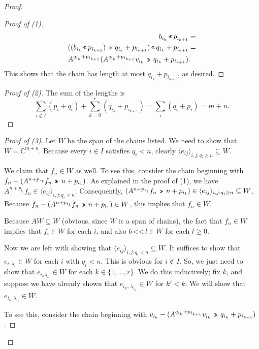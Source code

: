 \documentclass[12pt,psamsfonts]{article}
\newcommand{\leftshift}{\,\texttt{<<}\,}
\newcommand{\rightshift}{\mathbin{\rotatebox[origin=c]{180}{\leftshift}}}
\begin{document}
\begin{proof}
\begin{proof}[Proof of (1)]
\begin{align*}
            b_{i_k} \leftshift p_{i_{k + 1}} & = \\
            ((b_{i_k} \leftshift p_{i_{k + 1}}) \rightshift q_{i_k} + p_{i_{k + 1}}) \leftshift q_{i_k} + p_{i_{k + 1}} & = \\
            A^{q_{i_k} + p_{i_{k + 1}}}(A^{q_{i_k} + p_{i_{k + 1}}} v_{i_k} \rightshift q_{i_k} + p_{i_{k + 1}}) & .
        \end{align*}
        This shows that the chain has length at most \(q_{i_k} + p_{i_{k + 1}}\), as desired.
    \end{proof}
    \begin{proof}[Proof of (2)]
        The sum of the lengths is
        \[\sum_{i \notin I} (p_i + q_i) + \sum_{k = 0}^r (q_{i_k} + p_{i_{k + 1}}) = \sum_i (q_i + p_i) = m + n.\]
    \end{proof}
    \begin{proof}[Proof of (3)]
        Let \(W\) be the span of the chains listed.
        We need to show that \(W = \mathbb{C}^{m + n}\).
        Because every \(i \in I\) satisfies \(q_i < n\), clearly \(\langle e_{ij}\rangle_{i,j : q_i \geq n} \subseteq W\).
        \par We claim that \(f_n \in W\) as well.
        To see this, consider the chain beginning with \(f_n - (A^{n + p_{i_1}} f_n \rightshift n + p_{i_1})\).
        As explained in the proof of (1), we have \(A^{n + p_{i_1}} f_n \in \langle e_{ij}\rangle_{i,j : q_i \geq n}\).
        Consequently, \((A^{n + p_{i_1}} f_n \rightshift n + p_{i_1}) \in \langle e_{ij} \rangle_{i,j : q_i \geq n} \subseteq W\).
        Because \(f_n - (A^{n + p_{i_1}} f_n \rightshift n + p_{i_1}) \in W\), this implies that \(f_n \in W\).
        \par Because \(AW \subseteq W\) (obvious, since \(W\) is a span of chains), the fact that \(f_n \in W\) implies that \(f_i \in W\) for each \(i\), and also \(b \leftshift l \in W\) for each \(l \geq 0\).
        \par Now we are left with showing that \(\langle e_{ij} \rangle_{i,j : q_i < n} \subseteq W\).
        It suffices to show that \(e_{i, \lambda_i} \in W\) for each \(i\) with \(q_i < n\).
        This is obvious for \(i \notin I\).
        So, we just need to show that \(e_{i_k\lambda_{i_k}} \in W\) for each \(k \in \{1, ..., r\}\).
        We do this inductively; fix \(k\), and suppose we have already shown that \(e_{i_{k'}, \lambda_{i_{k'}}} \in W\) for \(k' < k\).
        We will show that \(e_{i_k, \lambda_{i_k}} \in W\).
        \par To see this, consider the chain beginning with \(v_{i_k} - (A^{q_{i_k} + p_{i_{k + 1}}} v_{i_k} \rightshift q_{i_k} + p_{i_{k + 1}})\).

\end{proof}
\end{proof}
\end{document}
